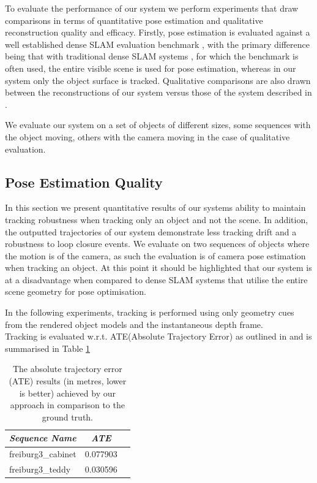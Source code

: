To evaluate the performance of our system we perform experiments that draw comparisons in terms of quantitative pose estimation and qualitative reconstruction quality and efficacy.
Firstly, pose estimation is evaluated against a well established dense SLAM evaluation benchmark \cite{sturm12iros}, with the primary difference being that with traditional dense SLAM 
systems \cite{Prisacariu2014,Niessner2013,Newcombe2011}, for which the benchmark is often used, the entire visible scene is used for pose estimation, whereas in our system only the object 
surface is tracked. Qualitative comparisons are also drawn between the reconstructions of our system versus those of the system described in \cite{Ren2013}.

We evaluate our system on a set of objects of different sizes, some sequences with the object moving, others with the camera moving in the case of qualitative evaluation. 

\subsection{Pose Estimation Quality}
In this section we present quantitative results of our systems ability to maintain tracking robustness when tracking only an object and not the scene. In addition, the outputted trajectories 
of our system demonstrate less tracking drift and a robustness to loop closure events. We evaluate on two sequences of objects where the motion is of the camera, as such the evaluation is of 
camera pose estimation when tracking an object. At this point it should be highlighted that our system is at a disadvantage when compared to dense SLAM systems that utilise the entire scene 
geometry for pose optimisation.

In the following experiments, tracking is performed using only geometry cues from the rendered object models and the instantaneous depth frame.\\

Tracking is evaluated w.r.t. ATE(Absolute Trajectory Error) as outlined in \cite{sturm12iros} and is summarised in Table \ref{ateTable}
\begin{table}[!t]
	{\small
		\begin{center}
			\begin{tabular}{l@{\hskip 1cm} c c}
				\emph{Sequence Name} & \emph{ATE}\\
				\midrule
				\textsf{freiburg3\_cabinet} & 0.077903\\
				\textsf{freiburg3\_teddy} & 0.030596\\
			\end{tabular}
		\end{center}
	}
	\caption{The absolute trajectory error (ATE) results (in metres, lower is better) achieved by our approach in comparison to the ground truth.}
	\label{ateTable}
\end{table}

